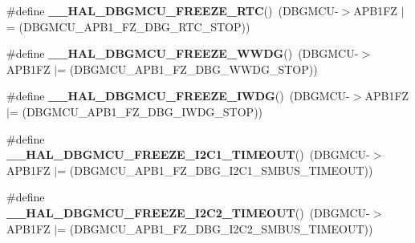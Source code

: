 \begin{DoxyCompactItemize}
\item 
\mbox{\label{group___h_a_l___exported___macros_ga6ea586c594feb6eb0f2aba52f1c69f4c}} 
\#define {\bfseries \+\_\+\+\_\+\+H\+A\+L\+\_\+\+D\+B\+G\+M\+C\+U\+\_\+\+F\+R\+E\+E\+Z\+E\+\_\+\+R\+TC}()~(D\+B\+G\+M\+CU-\/$>$A\+P\+B1\+FZ $\vert$= (D\+B\+G\+M\+C\+U\+\_\+\+A\+P\+B1\+\_\+\+F\+Z\+\_\+\+D\+B\+G\+\_\+\+R\+T\+C\+\_\+\+S\+T\+OP))
\item 
\mbox{\label{group___h_a_l___exported___macros_ga81215154725c479c67fb1adac906fbd9}} 
\#define {\bfseries \+\_\+\+\_\+\+H\+A\+L\+\_\+\+D\+B\+G\+M\+C\+U\+\_\+\+F\+R\+E\+E\+Z\+E\+\_\+\+W\+W\+DG}()~(D\+B\+G\+M\+CU-\/$>$A\+P\+B1\+FZ $\vert$= (D\+B\+G\+M\+C\+U\+\_\+\+A\+P\+B1\+\_\+\+F\+Z\+\_\+\+D\+B\+G\+\_\+\+W\+W\+D\+G\+\_\+\+S\+T\+OP))
\item 
\mbox{\label{group___h_a_l___exported___macros_gabab7ab631ba58fb6246a9385e8af9d0d}} 
\#define {\bfseries \+\_\+\+\_\+\+H\+A\+L\+\_\+\+D\+B\+G\+M\+C\+U\+\_\+\+F\+R\+E\+E\+Z\+E\+\_\+\+I\+W\+DG}()~(D\+B\+G\+M\+CU-\/$>$A\+P\+B1\+FZ $\vert$= (D\+B\+G\+M\+C\+U\+\_\+\+A\+P\+B1\+\_\+\+F\+Z\+\_\+\+D\+B\+G\+\_\+\+I\+W\+D\+G\+\_\+\+S\+T\+OP))
\item 
\mbox{\label{group___h_a_l___exported___macros_ga6160f642dcff812be3a04c5b5c66e31d}} 
\#define {\bfseries \+\_\+\+\_\+\+H\+A\+L\+\_\+\+D\+B\+G\+M\+C\+U\+\_\+\+F\+R\+E\+E\+Z\+E\+\_\+\+I2\+C1\+\_\+\+T\+I\+M\+E\+O\+UT}()~(D\+B\+G\+M\+CU-\/$>$A\+P\+B1\+FZ $\vert$= (D\+B\+G\+M\+C\+U\+\_\+\+A\+P\+B1\+\_\+\+F\+Z\+\_\+\+D\+B\+G\+\_\+\+I2\+C1\+\_\+\+S\+M\+B\+U\+S\+\_\+\+T\+I\+M\+E\+O\+UT))
\item 
\mbox{\label{group___h_a_l___exported___macros_gacc31f8475c2e3e30ee99e53814faa523}} 
\#define {\bfseries \+\_\+\+\_\+\+H\+A\+L\+\_\+\+D\+B\+G\+M\+C\+U\+\_\+\+F\+R\+E\+E\+Z\+E\+\_\+\+I2\+C2\+\_\+\+T\+I\+M\+E\+O\+UT}()~(D\+B\+G\+M\+CU-\/$>$A\+P\+B1\+FZ $\vert$= (D\+B\+G\+M\+C\+U\+\_\+\+A\+P\+B1\+\_\+\+F\+Z\+\_\+\+D\+B\+G\+\_\+\+I2\+C2\+\_\+\+S\+M\+B\+U\+S\+\_\+\+T\+I\+M\+E\+O\+UT))
\item 
\mbox{\label{group___h_a_l___exported___macros_gacd3fd0373b45de1b86be07bd4007c30e}} 

\end{DoxyCompactItemize}
